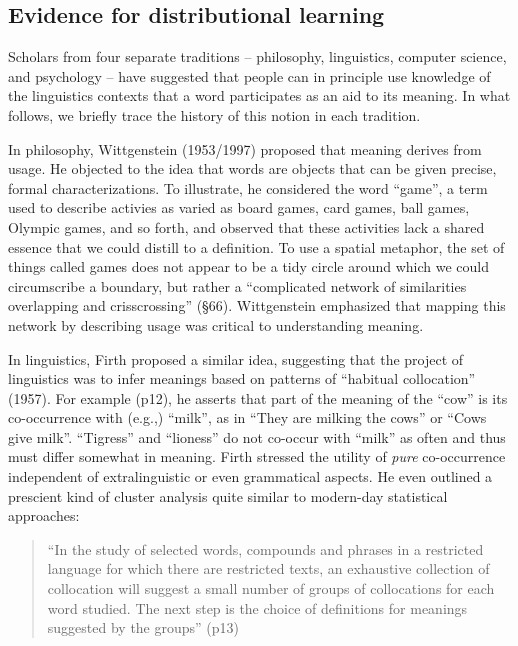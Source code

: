 \documentclass[man,floatsintext]{apa6}
\begin{document}
\subsection{Evidence for distributional learning}

Scholars from four separate traditions -- philosophy, linguistics,
computer science, and psychology -- have suggested that people can in
principle use knowledge of the linguistics contexts that a word
participates as an aid to its meaning. In what follows, we briefly
trace the history of this notion in each tradition.

In philosophy, Wittgenstein (1953/1997) proposed that meaning derives
from usage. He objected to the idea that words are objects that can be
given precise, formal characterizations. To illustrate, he considered
the word ``game'', a term used to describe activies as varied as board
games, card games, ball games, Olympic games, and so forth, and
observed that these activities lack a shared essence that we could
distill to a definition. To use a spatial metaphor, the set of things
called games does not appear to be a tidy circle around which we could
circumscribe a boundary, but rather a ``complicated network of
similarities overlapping and crisscrossing'' (\S 66). Wittgenstein
emphasized that mapping this network by describing usage was critical
to understanding meaning.

In linguistics, Firth proposed a similar idea, suggesting that the
project of linguistics was to infer meanings based on patterns of
``habitual collocation'' (1957). For example (p12), he asserts that
part of the meaning of the ``cow'' is its co-occurrence with (e.g.,)
``milk'', as in ``They are milking the cows'' or ``Cows give
milk''. ``Tigress'' and ``lioness'' do not co-occur with ``milk'' as
often and thus must differ somewhat in meaning. Firth stressed the
utility of \emph{pure} co-occurrence independent of extralinguistic or
even grammatical aspects. He even outlined a prescient kind of cluster
analysis quite similar to modern-day statistical approaches:

\begin{quote}
  ``In the study of selected words, compounds and phrases in a
  restricted language for which there are restricted texts, an
  exhaustive collection of collocation will suggest a small number of
  groups of collocations for each word studied. The next step is the
  choice of definitions for meanings suggested by the groups'' (p13)
\end{quote}
\end{document}
